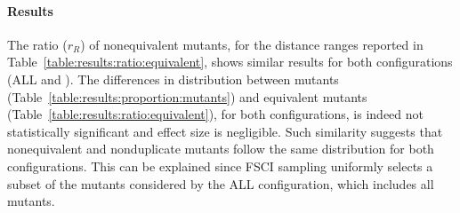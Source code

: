 



\paragraph{Results}



The ratio ($r_R$) of nonequivalent mutants, for the distance ranges reported in Table~\ref{table:results:ratio:equivalent}, shows
similar results for both configurations (ALL and \APPR). 
The differences in distribution between mutants (Table~\ref{table:results:proportion:mutants}) and equivalent mutants  (Table~\ref{table:results:ratio:equivalent}), for both  configurations, is indeed not statistically significant and effect size is negligible.
Such similarity suggests that nonequivalent and nonduplicate mutants follow the same distribution for both configurations. This can be explained since 
FSCI sampling uniformly selects 
a subset of the mutants considered by the ALL configuration, which includes all mutants. 



